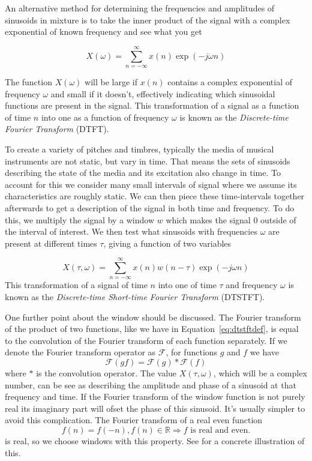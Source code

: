 An alternative method for determining the frequencies and amplitudes of
sinusoids in mixture is to take the inner product of the signal with a complex
exponential of known frequency and see what you get

\begin{equation}
    X(\omega) = \sum_{n=-\infty}^{\infty} x(n) \exp(-j \omega n)
\end{equation}

The function $X(\omega)$ will be large if $x(n)$ contains a complex exponential of
frequency $\omega$ and small if it doesn't, effectively indicating which
sinusoidal functions are present in the signal. This transformation of a signal
as a function of time $n$ into one as a function of frequency $\omega$ is known
as the \textit{Discrete-time Fourier Transform} (DTFT). 

To create a variety of pitches and timbres, typically the media of musical
instruments are not static, but vary in time. That means the sets of sinusoids
describing the state of the media and its excitation also change in time. To
account for this we consider many small intervals of signal where we assume its
characteristics are roughly static. We can then piece these time-intervals
together afterwards to get a description of the signal in both time and
frequency. To do this, we multiply the signal by a window $w$ which makes the signal
0 outside of the interval of interest. We then test what sinusoids with
frequencies $\omega$ are present at different times $\tau$, giving a function of
two variables

\begin{equation}
    \label{eq:dtstftdef}
    X(\tau,\omega) = \sum_{n=-\infty}^{\infty} x(n) w(n - \tau) \exp(-j \omega n)
\end{equation}
This transformation of a signal of time $n$ into one of time $\tau$ and
frequency $\omega$ is known as the \textit{Discrete-time Short-time Fourier
Transform} (DTSTFT).

One further point about the window should be discussed. The Fourier transform of
the product of two functions, like we have in Equation~\ref{eq:dtstftdef}, is
equal to the convolution of the Fourier transform of each function separately.
If we denote the Fourier transform operator as $\mathcal{F}$, for functions $g$
and $f$ we have
\[
    \mathcal{F}(gf) = \mathcal{F}(g)\ast\mathcal{F}(f)
\]
where $\ast$ is the convolution operator. The value $X(\tau,\omega)$, which will
be a complex number, can be see
as describing the amplitude and phase of a sinusoid at that frequency and time.
If the Fourier transform of the window function is not purely real its imaginary
part will ofset the phase of this sinusoid. It's usually simpler to avoid this
complication. The Fourier transform of a real even function
\[
    f(n) = f(-n), f(n) \in \mathbb{R} \Rightarrow f\text{ is real and even.}
\]
is real, so we choose windows with this property. See
\cite[p.~52]{harris1978use} for a concrete illustration of this.

